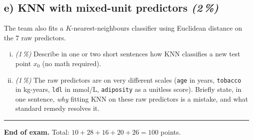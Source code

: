 \documentclass[11pt,a4paper]{article}
\newcommand{\subpoints}[1]{\textit{(#1\,\%)}}
\begin{document}
\subsection*{e) KNN with mixed-unit predictors \subpoints{2}}

The team also fits a $K$-nearest-neighbours classifier using Euclidean distance on the $7$ raw predictors.

\begin{enumerate}[(i)]
  \item \subpoints{1} Describe in one or two short sentences how KNN classifies a new test point $x_0$ (no math required).
  \item \subpoints{1} The raw predictors are on very different scales (\texttt{age} in years, \texttt{tobacco} in kg-years, \texttt{ldl} in mmol/L, \texttt{adiposity} as a unitless score). Briefly state, in one sentence, \emph{why} fitting KNN on these raw predictors is a mistake, and what standard remedy resolves it.
\end{enumerate}

\vspace{1em}
\hrule
\vspace{0.5em}

\noindent\textbf{End of exam.} \quad Total: $10 + 28 + 16 + 20 + 26 = 100$ points.
\end{document}
